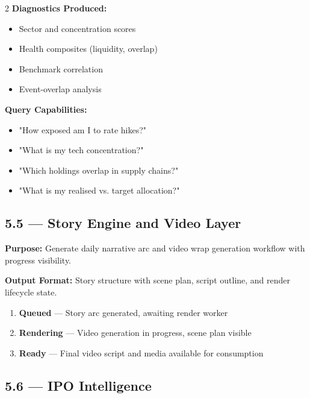 \documentclass[11pt,a4paper]{article}
\begin{document}
\begin{multicols}{2}
\small
\textbf{Diagnostics Produced:}
\begin{itemize}
    \item Sector and concentration scores
    \item Health composites (liquidity, overlap)
    \item Benchmark correlation
    \item Event-overlap analysis
\end{itemize}

\columnbreak

\textbf{Query Capabilities:}
\begin{itemize}
    \item "How exposed am I to rate hikes?"
    \item "What is my tech concentration?"
    \item "Which holdings overlap in supply chains?"
    \item "What is my realised vs. target allocation?"
\end{itemize}
\end{multicols}

\subsection{5.5 — Story Engine and Video Layer}

\textbf{Purpose:} Generate daily narrative arc and video wrap generation workflow with progress visibility.

\vspace{0.3cm}

\textbf{Output Format:} Story structure with scene plan, script outline, and render lifecycle state.

\vspace{0.3cm}

\begin{enumerate}[label={\color{mn-blue}\textbf{State \arabic*}}]
    \item \textbf{Queued} — Story arc generated, awaiting render worker
    \item \textbf{Rendering} — Video generation in progress, scene plan visible
    \item \textbf{Ready} — Final video script and media available for consumption
\end{enumerate}

\subsection{5.6 — IPO Intelligence}
\end{document}
